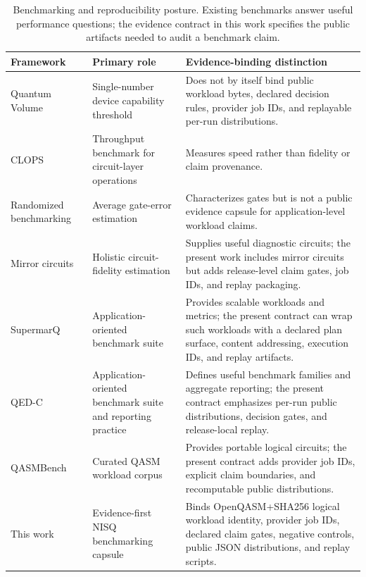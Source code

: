 \documentclass[aps,prxquantum,twocolumn,superscriptaddress,amsmath,amssymb,longbibliography,floatfix]{revtex4-2}
\begin{document}
\begin{table}[t]
\caption{Benchmarking and reproducibility posture. Existing benchmarks answer useful performance questions; the evidence contract in this work specifies the public artifacts needed to audit a benchmark claim.}
\label{tab:benchmark_comparison}
\begin{ruledtabular}
\begin{tabular}{lp{5.0cm}p{6.8cm}}
Framework & Primary role & Evidence-binding distinction \\
\hline
Quantum Volume~\cite{Cross2019} & Single-number device capability threshold & Does not by itself bind public workload bytes, declared decision rules, provider job IDs, and replayable per-run distributions. \\
CLOPS~\cite{Wack2021} & Throughput benchmark for circuit-layer operations & Measures speed rather than fidelity or claim provenance. \\
Randomized benchmarking~\cite{Emerson2005,Knill2008,Magesan2011} & Average gate-error estimation & Characterizes gates but is not a public evidence capsule for application-level workload claims. \\
Mirror circuits~\cite{Proctor2021} & Holistic circuit-fidelity estimation & Supplies useful diagnostic circuits; the present work includes mirror circuits but adds release-level claim gates, job IDs, and replay packaging. \\
SupermarQ~\cite{Tomesh2022} & Application-oriented benchmark suite & Provides scalable workloads and metrics; the present contract can wrap such workloads with a declared plan surface, content addressing, execution IDs, and replay artifacts. \\
QED-C~\cite{Lubinski2023} & Application-oriented benchmark suite and reporting practice & Defines useful benchmark families and aggregate reporting; the present contract emphasizes per-run public distributions, decision gates, and release-local replay. \\
QASMBench~\cite{Li2022qasmbench} & Curated QASM workload corpus & Provides portable logical circuits; the present contract adds provider job IDs, explicit claim boundaries, and recomputable public distributions. \\
This work & Evidence-first NISQ benchmarking capsule & Binds OpenQASM+SHA256 logical workload identity, provider job IDs, declared claim gates, negative controls, public JSON distributions, and replay scripts. \\
\end{tabular}
\end{ruledtabular}
\end{table}
\end{document}
